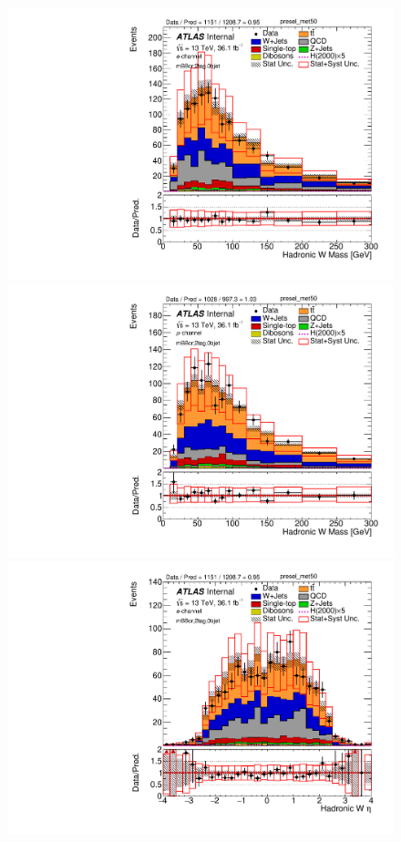 \begin{figure}[!h]
\begin{center}
\includegraphics[scale=0.33]{./figures/boosted/PlotByChannels/DataMC_2tag_0bjet_mbbcr_elec_presel_met50_WhadMass}
\includegraphics[scale=0.33]{./figures/boosted/PlotByChannels/DataMC_2tag_0bjet_mbbcr_muon_presel_met50_WhadMass}
\includegraphics[scale=0.33]{./figures/boosted/PlotByChannels/DataMC_2tag_0bjet_mbbcr_elec_presel_met50_WhadEta} 

\end{center}
\end{figure}
